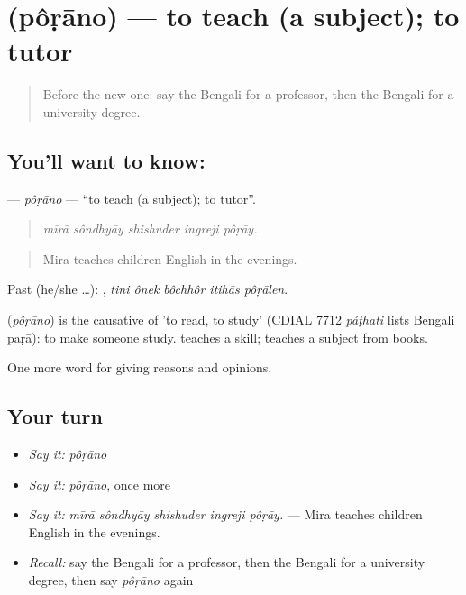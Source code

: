 \section[\texorpdfstring{\bn{পড়ানো} (pôṛāno)}{পড়ানো (pôṛāno)}]{ (pôṛāno) — to teach (a subject); to tutor}

\label{lesson:BN-C361-porano-teach}



\begin{quote}
Before the new one: say the Bengali for a professor, then the Bengali for a university degree.
\end{quote}

\subsection*{You'll want to know: }
\textbf{} — \emph{pôṛāno} — \textquotedblleft{}to teach (a subject); to tutor\textquotedblright{}.

\begin{quote}
    
\end{quote}

\begin{quote}
\emph{mīrā sôndhyāy shishuder ingreji pôṛāy.}
\end{quote}

\begin{quote}
Mira teaches children English in the evenings.
\end{quote}

Past (he/she …):     , \emph{tini ônek bôchhôr itihās pôṛālen}.

\begin{cousinweb}
\textbf{} (\emph{pôṛāno}) is the causative of  'to read, to study' (CDIAL 7712 \emph{páṭhati} lists Bengali paṛā): to make someone study.  teaches a skill;  teaches a subject from books.
\end{cousinweb}

\begin{grammarlens}[title={What you've built}]
One more word for giving reasons and opinions.
\end{grammarlens}

\subsection*{Your turn}
\begin{itemize}
\raggedright
  \item \emph{Say it:} \emph{pôṛāno}
  \item \emph{Say it:} \emph{pôṛāno}, once more
  \item \emph{Say it:} \emph{mīrā sôndhyāy shishuder ingreji pôṛāy.} — Mira teaches children English in the evenings.
  \item \emph{Recall:} say the Bengali for a professor, then the Bengali for a university degree, then say \emph{pôṛāno} again
\end{itemize}

